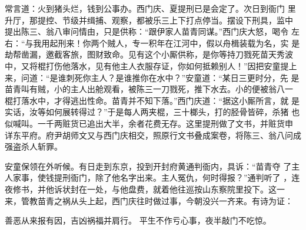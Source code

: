 常言道：火到猪头烂，钱到公事办。西门庆、夏提刑已是会定了。次日到衙门
里升厅，那提控、节级并缉捕、观察，都被乐三上下打点停当。摆设下刑具，监中
提出陈三、翁八审问情由，只是供称：“跟伊家人苗青同谋。”西门庆大怒，喝令
左右：“与我用起刑来！你两个贼人，专一积年在江河中，假以舟楫装载为名，实
是劫帮凿漏，邀截客旅，图财致命。见有这个小厮供称，是你等持刀戮死苗天秀波
中，又将棍打伤他落水，见有他主人衣服存证，你如何抵赖别人！”因把安童提上
来，问道：“是谁刺死你主人？是谁推你在水中？”安童道：“某日三更时分，先
是苗青叫有贼，小的主人出舱观看，被陈三一刀戮死，推下水去。小的便被翁八一
棍打落水中，才得逃出性命。苗青并不知下落。”西门庆道：“据这小厮所言，就
是实话，汝等如何展转得过？”于是每人两夹棍，三十榔头，打的胫骨皆碎，杀猪
也似喊叫。一千两赃货已追出大半，余者花费无存。这里提刑做了文书，并赃货申
详东平府。府尹胡师文又与西门庆相交，照原行文书叠成案卷，将陈三、翁八问成
强盗杀人斩罪。

安童保领在外听候。有日走到东京，投到开封府黄通判衙内，具诉：“苗青夺
了主人家事，使钱提刑衙门，除了他名字出来。主人冤仇，何时得报？”通判听了
，连夜修书，并他诉状封在一处，与他盘费，就着他往巡按山东察院里投下。这一
来，管教苗青之祸从头上起，西门庆往时做过事，今朝没兴一齐来。有诗为证：

善恶从来报有因，吉凶祸福并肩行。
平生不作亏心事，夜半敲门不吃惊。